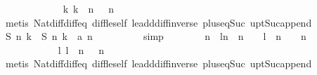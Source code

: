 \begin{isabellebody}
\ \ \ \ \ \ \ \ \isamarkupfalse%
\ \ {\isacharbackquoteopen}{}\ {\isasymle}\ k{\isacharbackquoteclose}\ {\isacharbackquoteopen}k\ {\isasymle}\ n{\isacharbackquoteclose}\ {\isacartoucheopen}{}\ {\isasymle}\ n{\isacartoucheclose}\isanewline
\ \ \ \ \ \ \ \ \isamarkupfalse%
\ {\isacharparenleft}metis\ Nat{\isachardot}diff{\isacharunderscore}diff{\isacharunderscore}eq\ diff{\isacharunderscore}le{\isacharunderscore}self\ le{\isacharunderscore}add{\isacharunderscore}diff{\isacharunderscore}inverse\ plus{\isacharunderscore}{}{\isacharunderscore}eq{\isacharunderscore}Suc\ upt{\isacharunderscore}Suc{\isacharunderscore}append{\isacharparenright}\isanewline
\ \ \ \ \ \ \isamarkupfalse%
\ \isamarkupfalse%
\ {\isachardoublequoteopen}{\isacharquery}S\ n\ k\ {\isacharequal}\ {\isacharquery}S\ {\isacharparenleft}n{\isacharminus}{}{\isacharparenright}\ {\isacharparenleft}k{\isacharminus}{}{\isacharparenright}\ {\isacharplus}\ a\ {\isacharparenleft}n{\isacharminus}{}{\isacharparenright}{\isachardoublequoteclose}\isanewline
\ \ \ \ \ \ \ \ \isamarkupfalse%
\ simp\isanewline
\isanewline
\ \ \ \ \ \ \isamarkupfalse%
\ {\isachardoublequoteopen}{\isacharbrackleft}n\ {\isacharminus}\ l{\isachardot}{\isachardot}{\isacharless}n{\isacharbrackright}\ {\isacharequal}\ {\isacharbrackleft}n\ {\isacharminus}\ {}\ {\isacharminus}\ {\isacharparenleft}l\ {\isacharminus}\ {}{\isacharparenright}{\isachardot}{\isachardot}{\isacharless}n\ {\isacharminus}\ {}{\isacharbrackright}\ {\isacharat}\ {\isacharbrackleft}n\ {\isacharminus}\ {}{\isacharbrackright}{\isachardoublequoteclose}\isanewline
\ \ \ \ \ \ \ \ \isamarkupfalse%
\ {\isacharbackquoteopen}{}\ {\isasymle}\ l{\isacharbackquoteclose}\ {\isacharbackquoteopen}l\ {\isasymle}\ n{\isacharbackquoteclose}\ {\isacartoucheopen}{}\ {\isasymle}\ n{\isacartoucheclose}\isanewline
\ \ \ \ \ \ \ \ \isamarkupfalse%
\ {\isacharparenleft}metis\ Nat{\isachardot}diff{\isacharunderscore}diff{\isacharunderscore}eq\ diff{\isacharunderscore}le{\isacharunderscore}self\ le{\isacharunderscore}add{\isacharunderscore}diff{\isacharunderscore}inverse\ plus{\isacharunderscore}{}{\isacharunderscore}eq{\isacharunderscore}Suc\ upt{\isacharunderscore}Suc{\isacharunderscore}append{\isacharparenright}\isanewline
\ \ \ \ \ \ \isamarkupfalse%
\ \isamarkupfalse%

\end{isabellebody}
